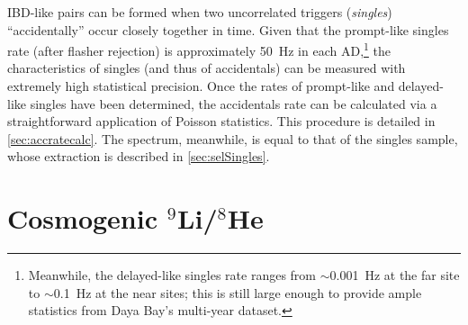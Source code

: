 \documentclass[../thesis.tex]{subfiles}
\begin{document}
IBD-like pairs can be formed when two uncorrelated triggers (\emph{singles}) ``accidentally'' occur closely together in time. Given that the prompt-like singles rate (after flasher rejection) is approximately 50~Hz in each AD,\footnote{Meanwhile, the delayed-like singles rate ranges from $\sim$0.001~Hz at the far site to $\sim$0.1~Hz at the near sites; this is still large enough to provide ample statistics from Daya Bay's multi-year dataset.} the characteristics of singles (and thus of accidentals) can be measured with extremely high statistical precision. Once the rates of prompt-like and delayed-like singles have been determined, the accidentals rate can be calculated via a straightforward application of Poisson statistics. This procedure is detailed in \autoref{sec:accratecalc}. The spectrum, meanwhile, is equal to that of the singles sample, whose extraction is described in \autoref{sec:selSingles}.

\begin{comment}
As previously stated, the accidental background can be straightforwardly measured based on the characteristics of singles events. The singles spectrum is first measured by searching for prompt-like events that satisfy the usual muon vetos but are separated from other prompt-like events by at least 400~$\mu$s. The total integral of this spectrum gives the prompt-like rate $R_p$, while the integral above 6~MeV gives the delayed-like rate $R_d$. The accidental background rate is then simply
\[ R_\mathrm{acc} = R_d(1 - e^{-R_p\Delta t})e^{-2R_p\Delta t}, \] where the factor in parentheses is the probability for a prompt-like single to fall within the $\Delta t$~=~200~$\mu$s preceding a delayed-like single, and the final factor is the probability that the event is \emph{not} rejected by the decoupled multiplicity cut, which disallows any additional prompt-like single in the 400~$\mu$s preceding the delayed event. Once the rate has been determined this way, the spectrum is trivial: It is simply the singles spectrum itself.
\end{comment}

\begin{comment}
  Mention IHEP's cross-check, and the additional uncertainty stemming from the difference between it and the nominal result?
\end{comment}

\section{Cosmogenic $^9$Li/$^8$He}
\label{sec:bkgCosmo}
\end{document}
